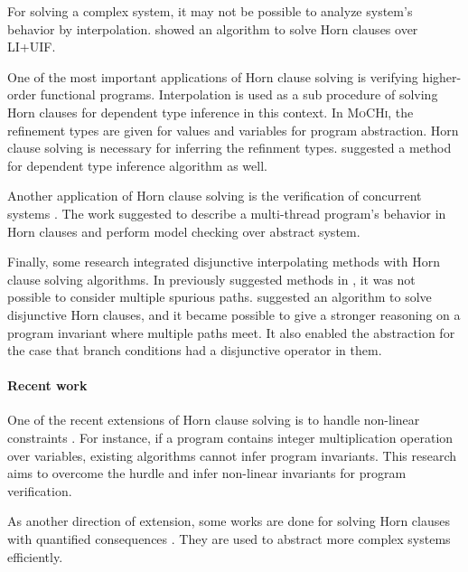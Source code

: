 For solving a complex system, it may not be possible to analyze
system's behavior by interpolation.  \cite{conf/aplas/GuptaPR11}
showed an algorithm to solve Horn clauses over LI+UIF.

One of the most important applications of Horn clause solving is
verifying higher-order functional programs.  Interpolation is used as
a sub procedure of solving Horn clauses for dependent type inference
\cite{conf/ppdp/UnnoK09, conf/pepm/SatoUK13} in this context. In
\textsc{MoCHi}, the refinement types are given for values and
variables for program abstraction.  Horn clause solving is necessary
for inferring the refinment types.  \cite{conf/popl/Terauchi10}
suggested a method for dependent type inference algorithm as well.

Another application of Horn clause solving is the verification of
concurrent systems \cite{conf/popl/GuptaPR11}. The work suggested to
describe a multi-thread program's behavior in Horn clauses and perform
model checking over abstract system.

Finally, some research integrated disjunctive interpolating methods
with Horn clause solving algorithms.  In previously suggested methods
in \cite{conf/popl/HenzingerJMM04, conf/cav/McMillan06}, it was not
possible to consider multiple spurious
paths.  \cite{conf/cav/RummerHK13} suggested an algorithm to solve
disjunctive Horn clauses, and it became possible to give a stronger
reasoning on a program invariant where multiple paths meet.  It also
enabled the abstraction for the case that branch conditions had a
disjunctive operator in them.

\paragraph{Recent work}

One of the recent extensions of Horn clause solving is to handle
non-linear constraints \cite{conf/cav/DaiXZ13}.  For instance, if a
program contains integer multiplication operation over variables,
existing algorithms cannot infer program invariants.  This research
aims to overcome the hurdle and infer non-linear invariants for
program verification.

As another direction of extension, some works are done for solving
Horn clauses with quantified consequences \cite{conf/sas/BjornerMR13,
conf/cav/BeyenePR13}.  They are used to abstract more complex systems
efficiently.
